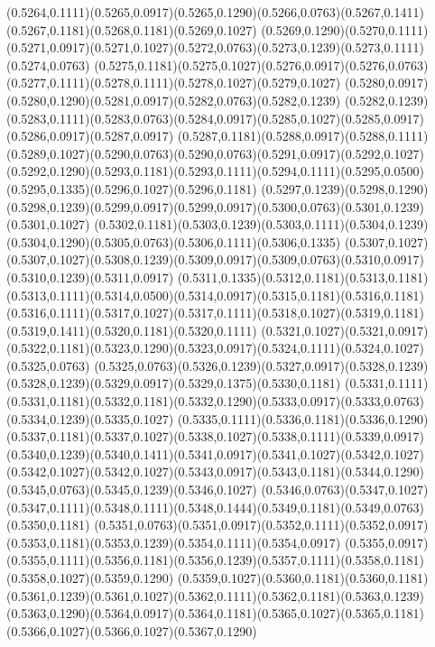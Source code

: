(0.5264,0.1111)(0.5265,0.0917)(0.5265,0.1290)(0.5266,0.0763)(0.5267,0.1411)(0.5267,0.1181)(0.5268,0.1181)(0.5269,0.1027)
(0.5269,0.1290)(0.5270,0.1111)(0.5271,0.0917)(0.5271,0.1027)(0.5272,0.0763)(0.5273,0.1239)(0.5273,0.1111)(0.5274,0.0763)
(0.5275,0.1181)(0.5275,0.1027)(0.5276,0.0917)(0.5276,0.0763)(0.5277,0.1111)(0.5278,0.1111)(0.5278,0.1027)(0.5279,0.1027)
(0.5280,0.0917)(0.5280,0.1290)(0.5281,0.0917)(0.5282,0.0763)(0.5282,0.1239)
\PST@Solid(0.5282,0.1239)(0.5283,0.1111)(0.5283,0.0763)(0.5284,0.0917)(0.5285,0.1027)(0.5285,0.0917)(0.5286,0.0917)(0.5287,0.0917)
(0.5287,0.1181)(0.5288,0.0917)(0.5288,0.1111)(0.5289,0.1027)(0.5290,0.0763)(0.5290,0.0763)(0.5291,0.0917)(0.5292,0.1027)
(0.5292,0.1290)(0.5293,0.1181)(0.5293,0.1111)(0.5294,0.1111)(0.5295,0.0500)(0.5295,0.1335)(0.5296,0.1027)(0.5296,0.1181)
(0.5297,0.1239)(0.5298,0.1290)(0.5298,0.1239)(0.5299,0.0917)(0.5299,0.0917)(0.5300,0.0763)(0.5301,0.1239)(0.5301,0.1027)
(0.5302,0.1181)(0.5303,0.1239)(0.5303,0.1111)(0.5304,0.1239)(0.5304,0.1290)(0.5305,0.0763)(0.5306,0.1111)(0.5306,0.1335)
(0.5307,0.1027)(0.5307,0.1027)(0.5308,0.1239)(0.5309,0.0917)(0.5309,0.0763)(0.5310,0.0917)(0.5310,0.1239)(0.5311,0.0917)
(0.5311,0.1335)(0.5312,0.1181)(0.5313,0.1181)(0.5313,0.1111)(0.5314,0.0500)(0.5314,0.0917)(0.5315,0.1181)(0.5316,0.1181)
(0.5316,0.1111)(0.5317,0.1027)(0.5317,0.1111)(0.5318,0.1027)(0.5319,0.1181)(0.5319,0.1411)(0.5320,0.1181)(0.5320,0.1111)
(0.5321,0.1027)(0.5321,0.0917)(0.5322,0.1181)(0.5323,0.1290)(0.5323,0.0917)(0.5324,0.1111)(0.5324,0.1027)(0.5325,0.0763)
(0.5325,0.0763)(0.5326,0.1239)(0.5327,0.0917)(0.5328,0.1239)(0.5328,0.1239)(0.5329,0.0917)(0.5329,0.1375)(0.5330,0.1181)
(0.5331,0.1111)(0.5331,0.1181)(0.5332,0.1181)(0.5332,0.1290)(0.5333,0.0917)(0.5333,0.0763)(0.5334,0.1239)(0.5335,0.1027)
(0.5335,0.1111)(0.5336,0.1181)(0.5336,0.1290)(0.5337,0.1181)(0.5337,0.1027)(0.5338,0.1027)(0.5338,0.1111)(0.5339,0.0917)
(0.5340,0.1239)(0.5340,0.1411)(0.5341,0.0917)(0.5341,0.1027)(0.5342,0.1027)
\PST@Solid(0.5342,0.1027)(0.5342,0.1027)(0.5343,0.0917)(0.5343,0.1181)(0.5344,0.1290)(0.5345,0.0763)(0.5345,0.1239)(0.5346,0.1027)
(0.5346,0.0763)(0.5347,0.1027)(0.5347,0.1111)(0.5348,0.1111)(0.5348,0.1444)(0.5349,0.1181)(0.5349,0.0763)(0.5350,0.1181)
(0.5351,0.0763)(0.5351,0.0917)(0.5352,0.1111)(0.5352,0.0917)(0.5353,0.1181)(0.5353,0.1239)(0.5354,0.1111)(0.5354,0.0917)
(0.5355,0.0917)(0.5355,0.1111)(0.5356,0.1181)(0.5356,0.1239)(0.5357,0.1111)(0.5358,0.1181)(0.5358,0.1027)(0.5359,0.1290)
(0.5359,0.1027)(0.5360,0.1181)(0.5360,0.1181)(0.5361,0.1239)(0.5361,0.1027)(0.5362,0.1111)(0.5362,0.1181)(0.5363,0.1239)
(0.5363,0.1290)(0.5364,0.0917)(0.5364,0.1181)(0.5365,0.1027)(0.5365,0.1181)(0.5366,0.1027)(0.5366,0.1027)(0.5367,0.1290)
